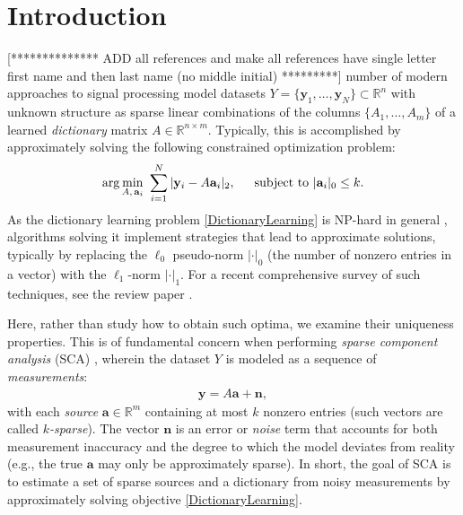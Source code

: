 \documentclass[journal, onecolumn]{IEEEtran}
\begin{document}
\section{Introduction}
[************** ADD all references and make all references have single letter first name and then last name (no middle initial) *********]
 number of modern approaches to signal processing model datasets $Y = \{\mathbf{y}_1, \ldots, \mathbf{y}_N\} \subset \mathbb{R}^n$ with unknown structure as sparse linear combinations of the columns $\{A_1,\ldots,A_m\}$ of a learned \textit{dictionary} matrix $A \in \mathbb R^{n\times m}$.  Typically, this is accomplished by approximately solving the following constrained optimization problem:
\begin{align}\label{DictionaryLearning}
\arg \min_{A, \, \mathbf{a}_i} \  \sum_{i=1}^N |\mathbf{y}_i - A\mathbf{a}_i|_2, \indent \text{subject to } |\mathbf{a}_i|_0 \leq k.
\end{align}
As the dictionary learning problem \eqref{DictionaryLearning} is NP-hard in general \cite{Tillmann15}, algorithms solving it implement strategies that lead to approximate solutions, typically by replacing the $\ell_0$ pseudo-norm $|\cdot|_0$ (the number of nonzero entries in a vector) with the $\ell_1$-norm $|\cdot|_1$. For a recent comprehensive survey of such techniques, see the review paper \cite{Zhang15}.

Here, rather than study how to obtain such optima, we examine their uniqueness properties. This is of fundamental concern when performing \emph{sparse component analysis} (SCA) \cite{Georgiev05}, wherein the dataset $Y$ is modeled as a sequence of \emph{measurements}:
\begin{align}\label{LinearModel}
\mathbf{y} = A\mathbf{a} + \mathbf{n},
\end{align}
with each \textit{source} $\mathbf{a} \in \mathbb R^m$ containing at most $k$ nonzero entries (such vectors are called \emph{$k$-sparse}).
The vector $\mathbf{n}$ is an error or \textit{noise} term that accounts for both measurement inaccuracy and the degree to which the model deviates from reality (e.g., the true $\mathbf{a}$ may only be approximately sparse).  In short, the goal of SCA is to estimate a set of sparse sources and a dictionary from noisy measurements by approximately solving objective \eqref{DictionaryLearning}.
\end{document}
